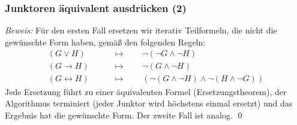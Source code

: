 \documentclass[aspectratio=1610,onlymath]{beamer}
\let\beameroriginaldoublebackslash\\
\let\\=\beameroriginaldoublebackslash
\begin{document}
\begin{frame}\frametitle{Junktoren äquivalent ausdrücken (2)}


\pause

\emph{Beweis:} Für den ersten Fall ersetzen wir iterativ Teilformeln, die nicht die gewünschte Form haben, gemäß den folgenden Regeln:
\begin{align*}
(G\vee H) &\qquad\mapsto\qquad \neg(\neg G\wedge\neg H)\\
(G\to H) &\qquad\mapsto\qquad\neg (G\wedge\neg H)\\
(G\leftrightarrow H) &\qquad\mapsto\qquad (\neg (G\wedge\neg H)\wedge\neg (H\wedge\neg G))
\end{align*}
Jede Ersetzung führt zu einer äquivalenten Formel (Ersetzungstheorem), der Algorithmus terminiert (jeder Junktor wird höchstens einmal ersetzt) und das Ergebnis hat die gewünschte Form.
% 
Der zweite Fall ist analog.
\qed

\end{frame}
\end{document}
